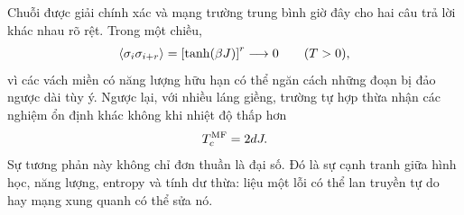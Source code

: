 Chuỗi được giải chính xác và mạng trường trung bình giờ đây cho hai câu trả lời khác nhau rõ rệt. Trong một chiều,
\begin{equation}
\left\langle\sigma_i\sigma_{i+r}\right\rangle
=\left[\tanh(\beta J)\right]^r
\longrightarrow0
\qquad (T>0),
\end{equation}
vì các vách miền có năng lượng hữu hạn có thể ngăn cách những đoạn bị đảo ngược dài tùy ý. Ngược lại, với nhiều láng giềng, trường tự hợp thừa nhận các nghiệm ổn định khác không khi nhiệt độ thấp hơn
\begin{equation}
T_c^{\rm MF}=2dJ.
\end{equation}
Sự tương phản này không chỉ đơn thuần là đại số. Đó là sự cạnh tranh giữa hình học, năng lượng, entropy và tính dư thừa: liệu một lỗi có thể lan truyền tự do hay mạng xung quanh có thể sửa nó.